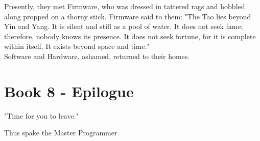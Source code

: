 \documentclass[14pt, letterpaper]{book}
\begin{document}
Presently, they met Firmware, who was dressed in tattered rags and hobbled along propped on a thorny stick. Firmware said to them: "The Tao lies beyond Yin and Yang. It is silent and still as a pool of water. It does not seek fame; therefore, nobody knows its presence. It does not seek fortune, for it is complete within itself. It exists beyond space and time."\\

Software and Hardware, ashamed, returned to their homes.

\chapter*{Book 8 - Epilogue}
\epigraph{"Time for you to leave."}{Thus spake the Master Programmer}
\end{document}
